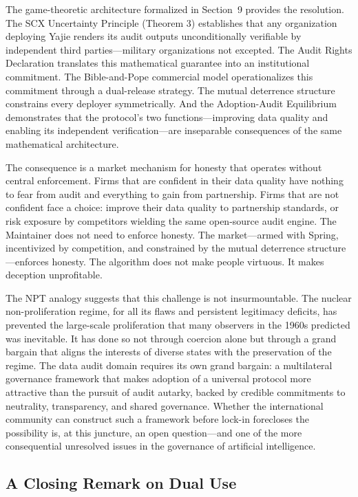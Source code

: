 \documentclass[12pt,a4paper]{ctexart}
\theoremstyle{definition}
\theoremstyle{remark}
\begin{document}
The game-theoretic architecture formalized in Section~9 provides the resolution. The SCX Uncertainty Principle (Theorem 3) establishes that any organization deploying Yajie renders its audit outputs unconditionally verifiable by independent third parties—military organizations not excepted. The Audit Rights Declaration translates this mathematical guarantee into an institutional commitment. The Bible-and-Pope commercial model operationalizes this commitment through a dual-release strategy. The mutual deterrence structure constrains every deployer symmetrically. And the Adoption-Audit Equilibrium demonstrates that the protocol's two functions—improving data quality and enabling its independent verification—are inseparable consequences of the same mathematical architecture.

The consequence is a market mechanism for honesty that operates without central enforcement. Firms that are confident in their data quality have nothing to fear from audit and everything to gain from partnership. Firms that are not confident face a choice: improve their data quality to partnership standards, or risk exposure by competitors wielding the same open-source audit engine. The Maintainer does not need to enforce honesty. The market—armed with Spring, incentivized by competition, and constrained by the mutual deterrence structure—enforces honesty. The algorithm does not make people virtuous. It makes deception unprofitable.

The NPT analogy suggests that this challenge is not insurmountable. The nuclear non-proliferation regime, for all its flaws and persistent legitimacy deficits, has prevented the large-scale proliferation that many observers in the 1960s predicted was inevitable. It has done so not through coercion alone but through a grand bargain that aligns the interests of diverse states with the preservation of the regime. The data audit domain requires its own grand bargain: a multilateral governance framework that makes adoption of a universal protocol more attractive than the pursuit of audit autarky, backed by credible commitments to neutrality, transparency, and shared governance. Whether the international community can construct such a framework before lock-in forecloses the possibility is, at this juncture, an open question—and one of the more consequential unresolved issues in the governance of artificial intelligence.

\subsection{A Closing Remark on Dual Use}
\end{document}
